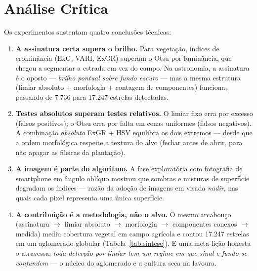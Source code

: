 \documentclass[12pt,a4paper]{article}
\begin{document}
\section{Análise Crítica}

Os experimentos sustentam quatro conclusões técnicas:

\begin{enumerate}
  \item \textbf{A assinatura certa supera o brilho.} Para vegetação, índices de crominância
        (ExG, VARI, ExGR) superam o Otsu por luminância, que chegou a segmentar a estrada em vez
        do campo. Na astronomia, a assinatura é o oposto --- \emph{brilho pontual sobre fundo
        escuro} --- mas a mesma estrutura (limiar absoluto + morfologia + contagem de componentes)
        funciona, passando de 7.736 para 17.247 estrelas detectadas.
  \item \textbf{Testes absolutos superam testes relativos.} O limiar fixo erra por excesso
        (falsos positivos); o Otsu erra por falta em cenas uniformes (falsos negativos). A
        combinação \emph{absoluta} ExGR + HSV equilibra os dois extremos --- desde que a ordem
        morfológica respeite a textura do alvo (fechar antes de abrir, para não apagar as
        fileiras da plantação).
  \item \textbf{A imagem é parte do algoritmo.} A fase exploratória com fotografia de smartphone
        em ângulo oblíquo mostrou que sombras e misturas de superfície degradam os índices ---
        razão da adoção de imagens em visada \emph{nadir}, nas quais cada pixel representa uma
        única superfície.
  \item \textbf{A contribuição é a metodologia, não o alvo.} O mesmo arcabouço
        (assinatura $\rightarrow$ limiar absoluto $\rightarrow$ morfologia $\rightarrow$
        componentes conexos $\rightarrow$ medida) mediu cobertura vegetal em campo agrícola e
        contou 17.247 estrelas em um aglomerado globular (Tabela~\ref{tab:sintese}). E uma
        meta-lição honesta o atravessa: \emph{toda detecção por limiar tem um regime em que sinal
        e fundo se confundem} --- o núcleo do aglomerado e a cultura seca na lavoura.
\end{enumerate}
\end{document}
